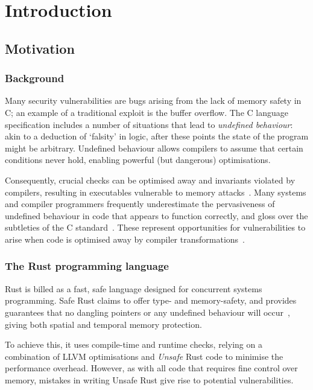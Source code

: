 \documentclass[dissertation.tex]{subfiles}
\begin{document}
\chapter{Introduction}
\label{ch:intro}

\section{Motivation}
\label{sec:intro-motiv}

\subsection{Background}
Many security vulnerabilities are bugs arising from the lack of memory
safety in C; an example of a traditional exploit is the buffer overflow.
The C language specification includes a number of situations that lead
to \emph{undefined behaviour}: akin to a deduction of `falsity' in
logic, after these points the state of the program might be arbitrary.
Undefined behaviour allows compilers to assume that certain conditions
never hold, enabling powerful (but dangerous) optimisations.

Consequently, crucial checks can be optimised away and invariants
violated by compilers, resulting in executables vulnerable to memory
attacks~\cite{simon2018wygiwyc}.
Many systems and compiler programmers frequently underestimate the
pervasiveness of undefined behaviour in code that appears to function
correctly, and gloss over the subtleties of the C
standard~\cite{memarian2016cdepths}.
These represent opportunities for vulnerabilities to arise when code is
optimised away by compiler transformations~\cite{wang2013towards}.


\subsection{The Rust programming language}

Rust is billed as a fast, safe language designed for concurrent systems
programming.
Safe Rust claims to offer type- and memory-safety, and provides
guarantees that no dangling pointers or any undefined behaviour will
occur~\cite{rust-nomicon-safe-unsafe}, giving both spatial and temporal
memory protection.

To achieve this, it uses compile-time and runtime checks, relying on a
combination of LLVM optimisations and \emph{Unsafe} Rust code to
minimise the performance overhead.
However, as with all code that requires fine control over memory,
mistakes in writing Unsafe Rust give rise to potential vulnerabilities.
\end{document}
